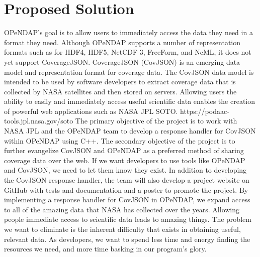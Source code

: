 \documentclass[letterpaper,10pt,draftclsnofoot,onecolumn]{IEEEtran}
\begin{document}
\section{Proposed Solution}
OPeNDAP’s goal is to allow users to immediately access the data they need in a format they need. Although OPeNDAP supports a number of representation formats such as for HDF4, HDF5, NetCDF 3, FreeForm, and NcML, it does not yet support CoverageJSON. CoverageJSON (CovJSON) is an emerging data model and representation format for coverage data. The CovJSON data model is intended to be used by software developers to extract coverage data that is collected by NASA satellites and then stored on servers. Allowing users the ability to easily and immediately access useful scientific data enables the creation of powerful web applications such as NASA JPL SOTO. https://podaac-tools.jpl.nasa.gov/soto 
The primary objective of the project is to work with NASA JPL and the OPeNDAP team to develop a response handler for CovJSON within OPeNDAP using C++. The secondary objective of the project is to further evangelize CovJSON and OPeNDAP as a preferred method of sharing coverage data over the web. If we want developers to use tools like OPeNDAP and CovJSON, we need to let them know they exist. In addition to developing the CovJSON response handler, the team will also develop a project website on GitHub with tests and documentation and a poster to promote the project.
By implementing a response handler for CovJSON in OPeNDAP, we expand access to all of the amazing data that NASA has collected over the years. Allowing people immediate access to scientific data leads to amazing things. The problem we want to eliminate is the inherent difficulty that exists in obtaining useful, relevant data. As developers, we want to spend less time and energy finding the resources we need, and more time basking in our program’s glory.
\end{document}
